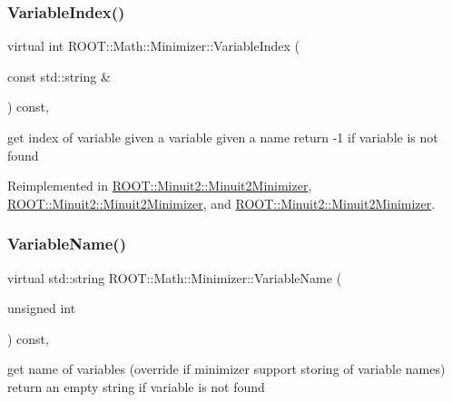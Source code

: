 \subsubsection{\texorpdfstring{VariableIndex()}{VariableIndex()}\hspace{0.1cm}{\footnotesize\ttfamily [3/3]}}
{\footnotesize\ttfamily virtual int R\+O\+O\+T\+::\+Math\+::\+Minimizer\+::\+Variable\+Index (\begin{DoxyParamCaption}\item[{const std\+::string \&}]{ }\end{DoxyParamCaption}) const\hspace{0.3cm}{\ttfamily [inline]}, {\ttfamily [virtual]}}

get index of variable given a variable given a name return -\/1 if variable is not found 

Reimplemented in \mbox{\hyperlink{classROOT_1_1Minuit2_1_1Minuit2Minimizer_a93839e851d16fff50898af2159d8863d}{R\+O\+O\+T\+::\+Minuit2\+::\+Minuit2\+Minimizer}}, \mbox{\hyperlink{classROOT_1_1Minuit2_1_1Minuit2Minimizer_a93839e851d16fff50898af2159d8863d}{R\+O\+O\+T\+::\+Minuit2\+::\+Minuit2\+Minimizer}}, and \mbox{\hyperlink{classROOT_1_1Minuit2_1_1Minuit2Minimizer_a93839e851d16fff50898af2159d8863d}{R\+O\+O\+T\+::\+Minuit2\+::\+Minuit2\+Minimizer}}.

\mbox{\label{classROOT_1_1Math_1_1Minimizer_a4d6a3c9c95608b35a25f16afd50690ad}} 
\subsubsection{\texorpdfstring{VariableName()}{VariableName()}\hspace{0.1cm}{\footnotesize\ttfamily [1/3]}}
{\footnotesize\ttfamily virtual std\+::string R\+O\+O\+T\+::\+Math\+::\+Minimizer\+::\+Variable\+Name (\begin{DoxyParamCaption}\item[{unsigned int}]{ }\end{DoxyParamCaption}) const\hspace{0.3cm}{\ttfamily [inline]}, {\ttfamily [virtual]}}

get name of variables (override if minimizer support storing of variable names) return an empty string if variable is not found 


